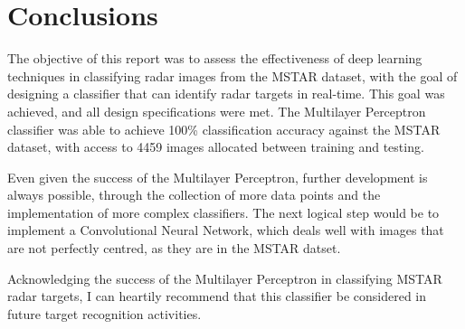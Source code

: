 \chapter{Conclusions}

The objective of this report was to assess the effectiveness of deep learning techniques in classifying radar images from the MSTAR dataset, with the goal of designing a classifier that can identify radar targets in real-time. This goal was achieved, and all design specifications were met. The Multilayer Perceptron classifier was able to achieve 100\% classification accuracy against the MSTAR dataset, with access to 4459 images allocated between training and testing. 

Even given the success of the Multilayer Perceptron, further development is always possible, through the collection of more data points and the implementation of more complex classifiers. The next logical step would be to implement a Convolutional Neural Network, which deals well with images that are not perfectly centred, as they are in the MSTAR datset.

Acknowledging the success of the Multilayer Perceptron in classifying MSTAR radar targets, I can heartily recommend that this classifier be considered in future target recognition activities. 